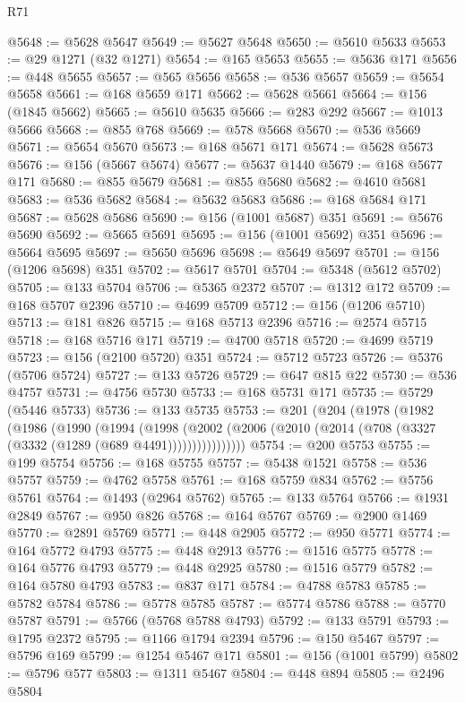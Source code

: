 \begin{lexlean}{R71}
\begin{coremodule}
@5648 := @5628 @5647
@5649 := @5627 @5648
@5650 := @5610 @5633
@5653 := @29 @1271 (@32 @1271)
@5654 := @165 @5653
@5655 := @5636 @171
@5656 := @448 @5655
@5657 := @565 @5656
@5658 := @536 @5657
@5659 := @5654 @5658
@5661 := @168 @5659 @171
@5662 := @5628 @5661
@5664 := @156 (@1845 @5662)
@5665 := @5610 @5635
@5666 := @283 @292
@5667 := @1013 @5666
@5668 := @855 @768
@5669 := @578 @5668
@5670 := @536 @5669
@5671 := @5654 @5670
@5673 := @168 @5671 @171
@5674 := @5628 @5673
@5676 := @156 (@5667 @5674)
@5677 := @5637 @1440
@5679 := @168 @5677 @171
@5680 := @855 @5679
@5681 := @855 @5680
@5682 := @4610 @5681
@5683 := @536 @5682
@5684 := @5632 @5683
@5686 := @168 @5684 @171
@5687 := @5628 @5686
@5690 := @156 (@1001 @5687) @351
@5691 := @5676 @5690
@5692 := @5665 @5691
@5695 := @156 (@1001 @5692) @351
@5696 := @5664 @5695
@5697 := @5650 @5696
@5698 := @5649 @5697
@5701 := @156 (@1206 @5698) @351
@5702 := @5617 @5701
@5704 := @5348 (@5612 @5702)
@5705 := @133 @5704
@5706 := @5365 @2372
@5707 := @1312 @172
@5709 := @168 @5707 @2396
@5710 := @4699 @5709
@5712 := @156 (@1206 @5710)
@5713 := @181 @826
@5715 := @168 @5713 @2396
@5716 := @2574 @5715
@5718 := @168 @5716 @171
@5719 := @4700 @5718
@5720 := @4699 @5719
@5723 := @156 (@2100 @5720) @351
@5724 := @5712 @5723
@5726 := @5376 (@5706 @5724)
@5727 := @133 @5726
@5729 := @647 @815 @22
@5730 := @536 @4757
@5731 := @4756 @5730
@5733 := @168 @5731 @171
@5735 := @5729 (@5446 @5733)
@5736 := @133 @5735
@5753 := @201
    (@204
      (@1978
        (@1982
          (@1986
            (@1990
              (@1994
                (@1998
                  (@2002 (@2006 (@2010 (@2014 (@708 (@3327 (@3332 (@1289 (@689 @4491))))))))))))))))
@5754 := @200 @5753
@5755 := @199 @5754
@5756 := @168 @5755
@5757 := @5438 @1521
@5758 := @536 @5757
@5759 := @4762 @5758
@5761 := @168 @5759 @834
@5762 := @5756 @5761
@5764 := @1493 (@2964 @5762)
@5765 := @133 @5764
@5766 := @1931 @2849
@5767 := @950 @826
@5768 := @164 @5767
@5769 := @2900 @1469
@5770 := @2891 @5769
@5771 := @448 @2905
@5772 := @950 @5771
@5774 := @164 @5772 @4793
@5775 := @448 @2913
@5776 := @1516 @5775
@5778 := @164 @5776 @4793
@5779 := @448 @2925
@5780 := @1516 @5779
@5782 := @164 @5780 @4793
@5783 := @837 @171
@5784 := @4788 @5783
@5785 := @5782 @5784
@5786 := @5778 @5785
@5787 := @5774 @5786
@5788 := @5770 @5787
@5791 := @5766 (@5768 @5788 @4793)
@5792 := @133 @5791
@5793 := @1795 @2372
@5795 := @1166 @1794 @2394
@5796 := @150 @5467
@5797 := @5796 @169
@5799 := @1254 @5467 @171
@5801 := @156 (@1001 @5799)
@5802 := @5796 @577
@5803 := @1311 @5467
@5804 := @448 @894
@5805 := @2496 @5804

\end{coremodule}
\end{lexlean}
